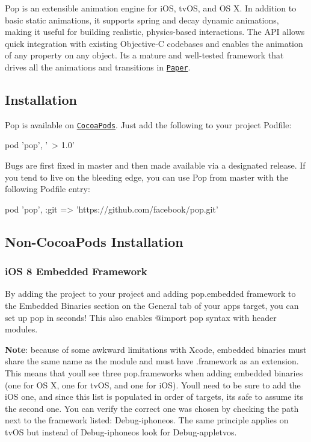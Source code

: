 

Pop is an extensible animation engine for i\+OS, tv\+OS, and OS X. In addition to basic static animations, it supports spring and decay dynamic animations, making it useful for building realistic, physics-\/based interactions. The A\+PI allows quick integration with existing Objective-\/C codebases and enables the animation of any property on any object. It\textquotesingle{}s a mature and well-\/tested framework that drives all the animations and transitions in \href{http://www.facebook.com/paper}{\tt Paper}.

\href{https://travis-ci.org/facebook/pop}{\tt }

\subsection*{Installation}

Pop is available on \href{http://cocoapods.org}{\tt Cocoa\+Pods}. Just add the following to your project Podfile\+:


\begin{DoxyCode}
pod 'pop', '~> 1.0'
\end{DoxyCode}


Bugs are first fixed in master and then made available via a designated release. If you tend to live on the bleeding edge, you can use Pop from master with the following Podfile entry\+:


\begin{DoxyCode}
pod 'pop', :git => 'https://github.com/facebook/pop.git'
\end{DoxyCode}


\subsection*{Non-\/\+Cocoa\+Pods Installation}

\subsubsection*{i\+OS 8 Embedded Framework}

By adding the project to your project and adding pop.\+embedded framework to the Embedded Binaries section on the General tab of your app\textquotesingle{}s target, you can set up pop in seconds! This also enables {\ttfamily @import pop} syntax with header modules.

{\bfseries Note}\+: because of some awkward limitations with Xcode, embedded binaries must share the same name as the module and must have {\ttfamily .framework} as an extension. This means that you\textquotesingle{}ll see three pop.\+frameworks when adding embedded binaries (one for OS X, one for tv\+OS, and one for i\+OS). You\textquotesingle{}ll need to be sure to add the i\+OS one, and since this list is populated in order of targets, it\textquotesingle{}s safe to assume it\textquotesingle{}s the second one. You can verify the correct one was chosen by checking the path next to the framework listed\+: {\ttfamily Debug-\/iphoneos}. The same principle applies on tv\+OS but instead of {\ttfamily Debug-\/iphoneos} look for {\ttfamily Debug-\/appletvos}.



